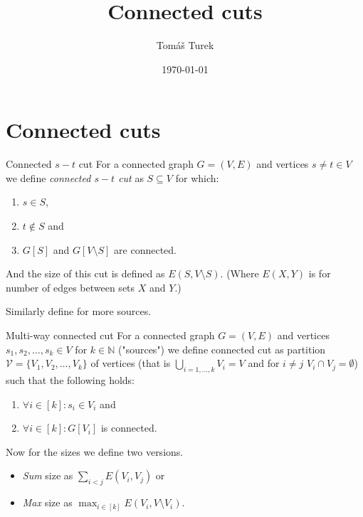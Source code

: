 \documentclass{article}
\title{Connected cuts}
\author{Tomáš Turek}
\date{\today}
\begin{document}
	\maketitle
	
	\section{Connected cuts}
	
	\begin{defn}{Connected $s-t$ cut}
		For a connected graph $G = (V,E)$ and vertices $s \neq t \in V$ we define \textit{connected $s-t$ cut} as $S \subseteq V$ for which:
		
		\begin{enumerate}
			\item $s \in S$,
			\item $t \notin S$ and
			\item $G[S]$ and $G[V \setminus S]$ are connected.
		\end{enumerate}
		
		\noindent And the size of this cut is defined as $E(S, V \setminus S)$. (Where $E(X,Y)$ is for number of edges between sets $X$ and $Y$.)
	\end{defn}
	
	\noindent Similarly define for more sources.
	
	\begin{defn}{Multi-way connected cut}
		For a connected graph $G = (V,E)$ and vertices $s_1, s_2, \dots, s_k \in V$ for $k \in \mathbb{N}$ ("sources") we define connected cut as partition $\mathcal{V} = \{V_1, V_2, \dots, V_k\}$ of vertices (that is $\bigcup_{i = 1, \dots, k} V_i = V$ and for $i \neq j$ $V_i \cap V_j = \emptyset$) such that the following holds:
		
		\begin{enumerate}
			\item $\forall i \in [k]: s_i \in V_i$ and
			\item $\forall i \in [k]: G[V_i]$ is connected.
		\end{enumerate}
		
		\noindent Now for the sizes we define two versions.
		
		\begin{itemize}
			\item \textit{Sum} size as $\sum_{i < j} E(V_i, V_j)$ or
			\item \textit{Max} size as $\max_{i \in[k]} E(V_i, V \setminus V_i)$.
		\end{itemize}
	\end{defn}
	
\end{document}
